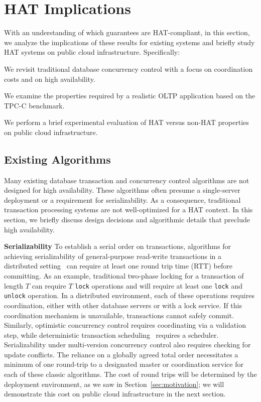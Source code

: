
\section{HAT Implications}
\label{sec:evaluation}

With an understanding of which guarantees are HAT-compliant, in this
section, we analyze the implications of these results for existing
systems and briefly study HAT systems on public cloud
infrastructure. Specifically:

\begin{myenumerate}\vspace{-.5em}
\item We revisit traditional database concurrency control with a focus
  on coordination costs and on high availability.
\item We examine the properties required by a realistic OLTP
  application based on the TPC-C benchmark.
\item We perform a brief experimental evaluation of HAT versus non-HAT
  properties on public cloud infrastructure.
\end{myenumerate}\vspace{-.5em}

\subsection{Existing Algorithms}

Many existing database transaction and concurrency control algorithms
are not designed for high availability. These algorithms often presume
a single-server deployment or a requirement for serializability. As
a consequence, traditional transaction processing systems are not
well-optimized for a HAT context. In this section, we briefly discuss
design decisions and algorithmic details that preclude high
availability.

\vspace{.5em}\noindent\textbf{Serializability} To establish a serial
order on transactions, algorithms for achieving serializability of
general-purpose read-write transactions in a distributed
setting~\cite{bernstein-book} can require at least one round trip time
(RTT) before committing. As an example, traditional two-phase locking
for a transaction of length $T$ can require $T$ \texttt{lock}
operations and will require at least one \texttt{lock} and
\texttt{unlock} operation.  In a distributed environment, each of
these operations requires coordination, either with other database
servers or with a lock service. If this coordination mechanism is
unavailable, transactions cannot safely commit. Similarly, optimistic
concurrency control requires coordinating via a validation step, while
deterministic transaction scheduling~\cite{deterministic-scheduling}
requires a scheduler. Serializability under multi-version concurrency
control also requires checking for update conflicts. The reliance on a
globally agreed total order necessitates a minimum of one round-trip
to a designated master or coordination service for each of these
classic algorithms.  The cost of round trips will be determined by the
deployment environment, as we saw in Section~\ref{sec:motivation}; we
will demonstrate this cost on public cloud infrastructure in the next
section.

